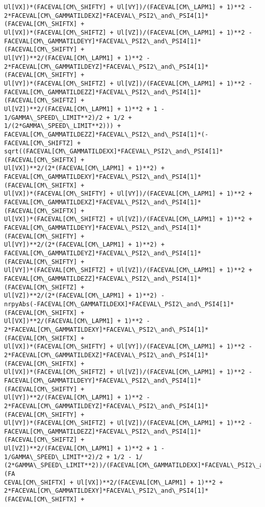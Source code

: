 \documentclass[landscape,letterpaper,10pt,english]{article}
\begin{document}
\begin{Verbatim}[commandchars=\\\{\}]
Ul[VX])*(FACEVAL[CM\_SHIFTY] + Ul[VY])/(FACEVAL[CM\_LAPM1] + 1)**2 -
2*FACEVAL[CM\_GAMMATILDEXZ]*FACEVAL\_PSI2\_and\_PSI4[1]*(FACEVAL[CM\_SHIFTX] +
Ul[VX])*(FACEVAL[CM\_SHIFTZ] + Ul[VZ])/(FACEVAL[CM\_LAPM1] + 1)**2 -
FACEVAL[CM\_GAMMATILDEYY]*FACEVAL\_PSI2\_and\_PSI4[1]*(FACEVAL[CM\_SHIFTY] +
Ul[VY])**2/(FACEVAL[CM\_LAPM1] + 1)**2 -
2*FACEVAL[CM\_GAMMATILDEYZ]*FACEVAL\_PSI2\_and\_PSI4[1]*(FACEVAL[CM\_SHIFTY] +
Ul[VY])*(FACEVAL[CM\_SHIFTZ] + Ul[VZ])/(FACEVAL[CM\_LAPM1] + 1)**2 -
FACEVAL[CM\_GAMMATILDEZZ]*FACEVAL\_PSI2\_and\_PSI4[1]*(FACEVAL[CM\_SHIFTZ] +
Ul[VZ])**2/(FACEVAL[CM\_LAPM1] + 1)**2 + 1 - 1/GAMMA\_SPEED\_LIMIT**2)/2 + 1/2 +
1/(2*GAMMA\_SPEED\_LIMIT**2))) +
FACEVAL[CM\_GAMMATILDEZZ]*FACEVAL\_PSI2\_and\_PSI4[1]*(-FACEVAL[CM\_SHIFTZ] +
sqrt((FACEVAL[CM\_GAMMATILDEXX]*FACEVAL\_PSI2\_and\_PSI4[1]*(FACEVAL[CM\_SHIFTX] +
Ul[VX])**2/(2*(FACEVAL[CM\_LAPM1] + 1)**2) +
FACEVAL[CM\_GAMMATILDEXY]*FACEVAL\_PSI2\_and\_PSI4[1]*(FACEVAL[CM\_SHIFTX] +
Ul[VX])*(FACEVAL[CM\_SHIFTY] + Ul[VY])/(FACEVAL[CM\_LAPM1] + 1)**2 +
FACEVAL[CM\_GAMMATILDEXZ]*FACEVAL\_PSI2\_and\_PSI4[1]*(FACEVAL[CM\_SHIFTX] +
Ul[VX])*(FACEVAL[CM\_SHIFTZ] + Ul[VZ])/(FACEVAL[CM\_LAPM1] + 1)**2 +
FACEVAL[CM\_GAMMATILDEYY]*FACEVAL\_PSI2\_and\_PSI4[1]*(FACEVAL[CM\_SHIFTY] +
Ul[VY])**2/(2*(FACEVAL[CM\_LAPM1] + 1)**2) +
FACEVAL[CM\_GAMMATILDEYZ]*FACEVAL\_PSI2\_and\_PSI4[1]*(FACEVAL[CM\_SHIFTY] +
Ul[VY])*(FACEVAL[CM\_SHIFTZ] + Ul[VZ])/(FACEVAL[CM\_LAPM1] + 1)**2 +
FACEVAL[CM\_GAMMATILDEZZ]*FACEVAL\_PSI2\_and\_PSI4[1]*(FACEVAL[CM\_SHIFTZ] +
Ul[VZ])**2/(2*(FACEVAL[CM\_LAPM1] + 1)**2) -
nrpyAbs(-FACEVAL[CM\_GAMMATILDEXX]*FACEVAL\_PSI2\_and\_PSI4[1]*(FACEVAL[CM\_SHIFTX] +
Ul[VX])**2/(FACEVAL[CM\_LAPM1] + 1)**2 -
2*FACEVAL[CM\_GAMMATILDEXY]*FACEVAL\_PSI2\_and\_PSI4[1]*(FACEVAL[CM\_SHIFTX] +
Ul[VX])*(FACEVAL[CM\_SHIFTY] + Ul[VY])/(FACEVAL[CM\_LAPM1] + 1)**2 -
2*FACEVAL[CM\_GAMMATILDEXZ]*FACEVAL\_PSI2\_and\_PSI4[1]*(FACEVAL[CM\_SHIFTX] +
Ul[VX])*(FACEVAL[CM\_SHIFTZ] + Ul[VZ])/(FACEVAL[CM\_LAPM1] + 1)**2 -
FACEVAL[CM\_GAMMATILDEYY]*FACEVAL\_PSI2\_and\_PSI4[1]*(FACEVAL[CM\_SHIFTY] +
Ul[VY])**2/(FACEVAL[CM\_LAPM1] + 1)**2 -
2*FACEVAL[CM\_GAMMATILDEYZ]*FACEVAL\_PSI2\_and\_PSI4[1]*(FACEVAL[CM\_SHIFTY] +
Ul[VY])*(FACEVAL[CM\_SHIFTZ] + Ul[VZ])/(FACEVAL[CM\_LAPM1] + 1)**2 -
FACEVAL[CM\_GAMMATILDEZZ]*FACEVAL\_PSI2\_and\_PSI4[1]*(FACEVAL[CM\_SHIFTZ] +
Ul[VZ])**2/(FACEVAL[CM\_LAPM1] + 1)**2 + 1 - 1/GAMMA\_SPEED\_LIMIT**2)/2 + 1/2 - 1/
(2*GAMMA\_SPEED\_LIMIT**2))/(FACEVAL[CM\_GAMMATILDEXX]*FACEVAL\_PSI2\_and\_PSI4[1]*(FA
CEVAL[CM\_SHIFTX] + Ul[VX])**2/(FACEVAL[CM\_LAPM1] + 1)**2 +
2*FACEVAL[CM\_GAMMATILDEXY]*FACEVAL\_PSI2\_and\_PSI4[1]*(FACEVAL[CM\_SHIFTX] +

\end{Verbatim}
\end{document}
